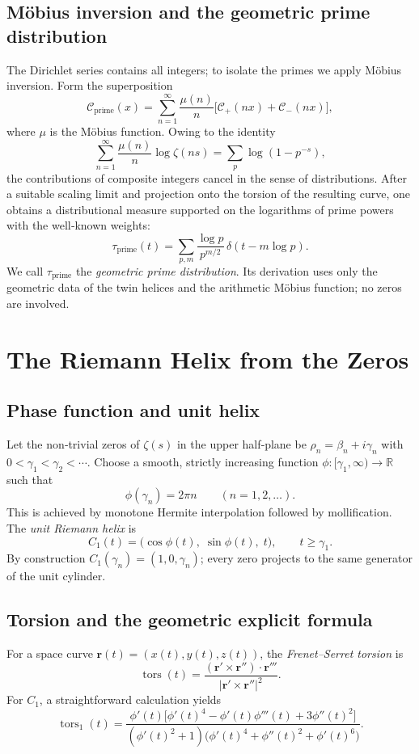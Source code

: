 \documentclass[12pt,a4paper]{article}
\newcommand{\R}{\mathbb{R}}
\newcommand{\tors}{\operatorname{tors}}
\begin{document}
\subsection{M\"obius inversion and the geometric prime distribution}
The Dirichlet series contains all integers; to isolate the primes we apply M\"obius inversion.  Form the superposition
\[
\mathcal{C}_{\mathrm{prime}}(x) = \sum_{n=1}^{\infty} \frac{\mu(n)}{n} \bigl[ \mathcal{C}_+(n x) + \mathcal{C}_-(n x) \bigr],
\]
where $\mu$ is the M\"obius function.  Owing to the identity
\[
\sum_{n=1}^{\infty} \frac{\mu(n)}{n} \log \zeta(n s) = \sum_{p} \log(1-p^{-s}),
\]
the contributions of composite integers cancel in the sense of distributions.  After a suitable scaling limit and projection onto the torsion of the resulting curve, one obtains a distributional measure supported on the logarithms of prime powers with the well‑known weights:
\begin{equation}\label{prime_dist}
\tau_{\mathrm{prime}}(t) = \sum_{p,m} \frac{\log p}{p^{m/2}} \, \delta(t - m \log p).
\end{equation}
We call $\tau_{\mathrm{prime}}$ the \emph{geometric prime distribution}.  Its derivation uses only the geometric data of the twin helices and the arithmetic M\"obius function; no zeros are involved.

\section{The Riemann Helix from the Zeros}

\subsection{Phase function and unit helix}
Let the non‑trivial zeros of $\zeta(s)$ in the upper half‑plane be $\rho_n = \beta_n + i \gamma_n$ with $0<\gamma_1<\gamma_2<\cdots$.  Choose a smooth, strictly increasing function $\phi:[\gamma_1,\infty)\to\R$ such that
\[
\phi(\gamma_n) = 2\pi n \qquad (n=1,2,\dots).
\]
This is achieved by monotone Hermite interpolation followed by mollification.  The \emph{unit Riemann helix} is
\[
C_1(t) = \bigl( \cos\phi(t),\; \sin\phi(t),\; t \bigr), \qquad t \ge \gamma_1.
\]
By construction $C_1(\gamma_n) = (1,0,\gamma_n)$; every zero projects to the same generator of the unit cylinder.

\subsection{Torsion and the geometric explicit formula}
For a space curve $\mathbf{r}(t) = (x(t),y(t),z(t))$, the \emph{Frenet–Serret torsion} is
\[
\tors(t) = \frac{(\mathbf{r}'\times\mathbf{r}'')\cdot\mathbf{r}'''}{|\mathbf{r}'\times\mathbf{r}''|^2}.
\]
For $C_1$, a straightforward calculation yields
\begin{equation}\label{tors_unit}
\tors_1(t) = \frac{\phi'(t)\bigl[ \phi'(t)^4 - \phi'(t)\phi'''(t) + 3\phi''(t)^2 \bigr]}
                  {(\phi'(t)^2+1)\bigl( \phi'(t)^4 + \phi''(t)^2 + \phi'(t)^6 \bigr)}.
\end{equation}
\end{document}
